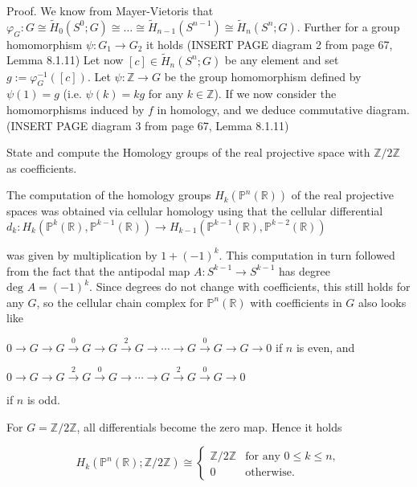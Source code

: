 Proof. 
We know from Mayer-Vietoris that
\(\varphi_G : G \cong \tilde{H}_0(S^0; G) \cong \ldots \cong \tilde{H}_{n-1}(S^{n-1}) \cong \tilde{H}_n(S^n; G).\)
Further for a group homomorphism \(\psi : G_1 \to G_2\) it holds
(INSERT PAGE diagram 2 from page 67, Lemma 8.1.11)
Let now \([c] \in \tilde{H}_n(S^n; G)\) be any element and set \(g := \varphi_{G}^{-1}([c])\). 
Let \(\psi : \mathbb{Z} \to G\) be the group homomorphism defined by \(\psi(1) = g\) (i.e. \(\psi(k) = kg\) for any \(k \in \mathbb{Z}\)). 
If we now consider the homomorphisms induced by \( f \) in homology, and we deduce 
commutative diagram.
(INSERT PAGE diagram 3 from page 67, Lemma 8.1.11)

State and compute the Homology groups of the real projective space with \( \mathbb{Z}/2\mathbb{Z} \) as coefficients.

The computation of the homology groups \(H_k(\mathbb{P}^n(\mathbb{R}))\) of the real projective spaces was obtained 
via cellular homology using that the cellular differential 
\(
d_k : H_k(\mathbb{P}^k(\mathbb{R}), \mathbb{P}^{k-1}(\mathbb{R})) \to H_{k-1}(\mathbb{P}^{k-1}(\mathbb{R}), \mathbb{P}^{k-2}(\mathbb{R}))
\)

was given by multiplication by \( 1 + (-1)^k \). This computation in turn followed from the fact that the antipodal map 
\( A : S^{k-1} \to S^{k-1} \) has degree \(\text{deg } A = (-1)^k\). Since degrees do not change with coefficients, this still holds for any \( G \), 
so the cellular chain complex for \(\mathbb{P}^n(\mathbb{R})\) with coefficients in \( G \) also looks like

\(
0 \longrightarrow G \longrightarrow G \xrightarrow{0} G \longrightarrow G \xrightarrow{2} G \longrightarrow \dotsb \longrightarrow G \xrightarrow{0} G \longrightarrow G \longrightarrow 0
\)
if \( n \) is even, and

\(
0 \longrightarrow G \longrightarrow G \xrightarrow{2} G \xrightarrow{0} G \longrightarrow \dotsb \longrightarrow G \xrightarrow{2} G \xrightarrow{0} G \longrightarrow 0
\)

if \( n \) is odd.

For \(G = \mathbb{Z}/2\mathbb{Z}\), all differentials become the zero map. Hence it holds

\[
H_k(\mathbb{P}^n(\mathbb{R}); \mathbb{Z}/2\mathbb{Z}) \cong 
\begin{cases}
\mathbb{Z}/2\mathbb{Z} & \text{for any } 0 \leq k \leq n, \\
0 & \text{otherwise.}
\end{cases}
\]

